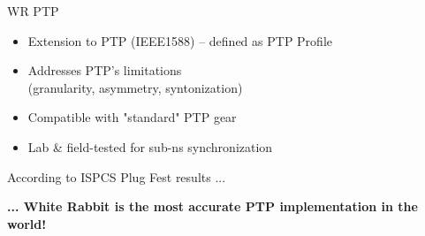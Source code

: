 \documentclass[compress,red]{beamer}
\begin{document}
% 
% 
\begin{frame}{WR PTP}

  \begin{itemize}
    \item Extension to PTP (IEEE1588) -- defined as PTP Profile
    \item Addresses PTP's limitations \\(granularity, asymmetry, syntonization)
    \item Compatible with "standard" PTP gear
    \item Lab \& field-tested for sub-ns synchronization
  \end{itemize}
  \begin{block}{According to ISPCS Plug Fest results ...}
    \begin{center}
      \textbf{... White Rabbit is the most accurate PTP implementation in the world!}
     \end{center}
  \end{block}

\end{frame}
\end{document}
